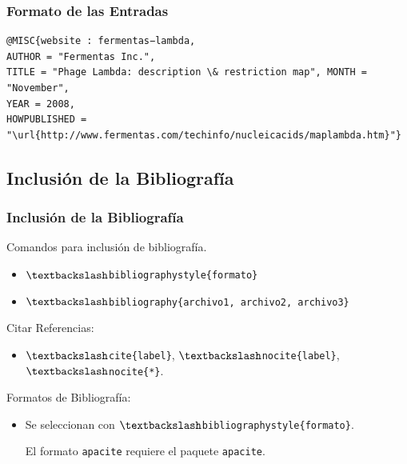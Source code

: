 \documentclass[aspectratio=1610]{beamer}%
\begin{document}
\begin{frame}[fragile]
\frametitle{\textbf{Formato de las Entradas}}
\justifying
 \begin{exampleblock}{}
   \vspace{-0.7cm}
\begin{lstlisting}
@MISC{website : fermentas−lambda,
AUTHOR = "Fermentas Inc.",
TITLE = "Phage Lambda: description \& restriction map", MONTH = "November",
YEAR = 2008,
HOWPUBLISHED = "\url{http://www.fermentas.com/techinfo/nucleicacids/maplambda.htm}"}
\end{lstlisting}\vspace{-0.3cm}
\end{exampleblock}
\end{frame}


\subsection{Inclusión de la Bibliografía}
\begin{frame}[fragile]
\frametitle{\textbf{Inclusión de la Bibliografía}}
\justifying
 Comandos para inclusión de bibliografía.
 \begin{itemize}\justifying
  \item \texttt{$\textbackslash$bibliographystyle\{formato\}}
  \item \texttt{$\textbackslash$bibliography\{archivo1, archivo2, archivo3\}}
\end{itemize}
\pause Citar Referencias:
\begin{itemize}\justifying
  \item \texttt{$\textbackslash$cite\{label\}}, \texttt{$\textbackslash$nocite\{label\}}, \texttt{$\textbackslash$nocite\{*\}}.
\end{itemize}
\pause Formatos de Bibliografía:
\begin{itemize}\justifying
  \item Se seleccionan con \texttt{$\textbackslash$bibliographystyle\{formato\}}.
El formato \texttt{apacite} requiere el paquete \texttt{apacite}.

\end{itemize}
\end{frame}
\end{document}
